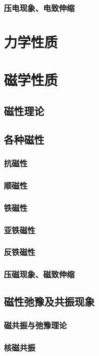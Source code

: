 \documentclass[UTF8]{../06-Physics}
\begin{document}
    \subsubsection{压电现象、电致伸缩}

\section{力学性质}

\section{磁学性质}
    \subsection{磁性理论}
    \subsection{各种磁性}
        \subsubsection{抗磁性}
        \subsubsection{顺磁性}
        \subsubsection{铁磁性}
        \subsubsection{亚铁磁性}
        \subsubsection{反铁磁性}
        \subsubsection{压磁现象、磁致伸缩}
    \subsection{磁性弛豫及共振现象}
        \subsubsection{磁共振与弛豫理论}
        \subsubsection{核磁共振}
\end{document}
